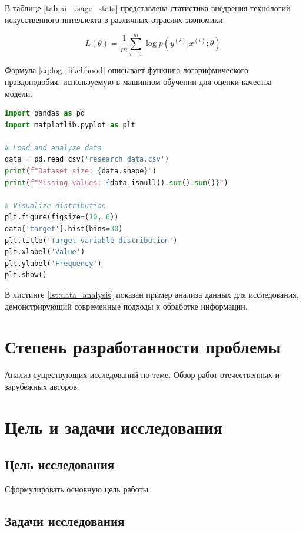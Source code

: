В таблице \ref{tab:ai_usage_stats} представлена статистика внедрения технологий искусственного интеллекта в различных отраслях экономики.

\begin{equation}
L(\theta) = \frac{1}{m} \sum_{i=1}^{m} \log p(y^{(i)} | x^{(i)}; \theta)
\label{eq:log_likelihood}
\end{equation}

Формула \ref{eq:log_likelihood} описывает функцию логарифмического правдоподобия, используемую в машинном обучении для оценки качества модели.

\begin{lstlisting}[style=code, language=Python, caption={Пример анализа данных}, label={lst:data_analysis}]
import pandas as pd
import matplotlib.pyplot as plt

# Load and analyze data
data = pd.read_csv('research_data.csv')
print(f"Dataset size: {data.shape}")
print(f"Missing values: {data.isnull().sum().sum()}")

# Visualize distribution
plt.figure(figsize=(10, 6))
data['target'].hist(bins=30)
plt.title('Target variable distribution')
plt.xlabel('Value')
plt.ylabel('Frequency')
plt.show()
\end{lstlisting}

В листинге \ref{lst:data_analysis} показан пример анализа данных для исследования, демонстрирующий современные подходы к обработке информации.

\section{Степень разработанности проблемы}

Анализ существующих исследований по теме. Обзор работ отечественных и зарубежных авторов.

\section{Цель и задачи исследования}

\subsection{Цель исследования}

Сформулировать основную цель работы.

\subsection{Задачи исследования}

